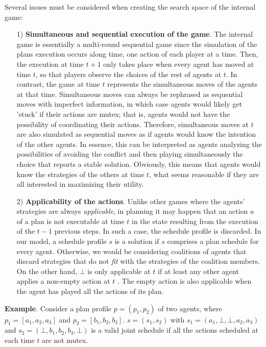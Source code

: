 \documentclass[letterpaper]{article}
\begin{document}
Several issues must be considered when creating the search space of the internal game:

\begin{itemize}

\item[1)] \textbf{Simultaneous and sequential execution of the game}. The internal game is essentially a multi-round sequential game since the simulation of the plans execution occurs along time, one action of each player at a time. Then, the execution at time $t+1$ only takes place when every agent has moved at time $t$, so that players observe the choices of the rest of agents at $t$. In contrast, the game at time $t$ represents the simultaneous moves of the agents at that time. Simultaneous moves can always be rephrased as sequential moves with imperfect information, in which case agents would likely get 'stuck' if their actions are mutex; that is, agents would not have the possibility of coordinating their actions. Therefore, simultaneous moves at $t$ are also simulated as sequential moves as if agents would know the intention of the other agents. In essence, this can be interpreted as agents analyzing the possibilities of avoiding the conflict and then playing simultaneously the choice that reports a stable solution. Obviously, this means that agents would know the strategies of the others at time $t$, what seems reasonable if they are all interested in maximizing their utility.

\item [2)] \textbf{Applicability of the actions}. Unlike other games where the agents' strategies are always \emph{applicable}, in planning it may happen that an action $a$ of a plan is not executable at time $t$ in the state resulting from the execution of the $t-1$ previous steps. In such a case, the schedule profile is discarded. In our model, a schedule profile $s$ is a solution if $s$ comprises a plan schedule for every agent. Otherwise, we would be considering coalitions of agents that discard strategies that do not \emph{fit} with the strategies of the coalition members. On the other hand, $\bot$ is only applicable at $t$ if at least any other agent applies a non-empty action at $t$ . The empty action is also applicable when the agent has played all the actions of its plan.

\end{itemize}

\textbf{Example}. Consider a plan profile $p=(p_1, p_2)$ of two agents, where $p_1 =[ a_1, a_2, a_3]$ and $p_2 =[ b_1, b_2, b_3]$. $s=(s_1, s_2)$ with $s_1=(a_1, \bot, \bot, a_2, a_3)$ and $s_2=(\bot, b_1, b_2, b_3, \bot)$ is a valid joint schedule if all the actions scheduled at each time $t$ are not mutex.
\end{document}
